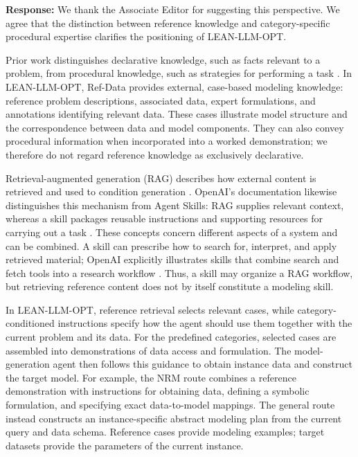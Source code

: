 {\color{blue}
\noindent\textbf{Response:}
We thank the Associate Editor for suggesting this perspective. We agree that the distinction between reference knowledge and category-specific procedural expertise clarifies the positioning of LEAN-LLM-OPT.

Prior work distinguishes declarative knowledge, such as facts relevant to a problem, from procedural knowledge, such as strategies for performing a task \citep{ae1_li2024metacognitive}. In LEAN-LLM-OPT, Ref-Data provides external, case-based modeling knowledge: reference problem descriptions, associated data, expert formulations, and annotations identifying relevant data. These cases illustrate model structure and the correspondence between data and model components. They can also convey procedural information when incorporated into a worked demonstration; we therefore do not regard reference knowledge as exclusively declarative.

Retrieval-augmented generation (RAG) describes how external content is retrieved and used to condition generation \citep{ae1_lewis2020rag}. OpenAI's documentation likewise distinguishes this mechanism from Agent Skills: RAG supplies relevant context, whereas a skill packages reusable instructions and supporting resources for carrying out a task \citep{ae1_openai2026accuracy,ae1_openai2026skills}. These concepts concern different aspects of a system and can be combined. A skill can prescribe how to search for, interpret, and apply retrieved material; OpenAI explicitly illustrates skills that combine search and fetch tools into a research workflow \citep{ae1_openai2026skilltools}. Thus, a skill may organize a RAG workflow, but retrieving reference content does not by itself constitute a modeling skill.

In LEAN-LLM-OPT, reference retrieval selects relevant cases, while category-conditioned instructions specify how the agent should use them together with the current problem and its data. For the predefined categories, selected cases are assembled into demonstrations of data access and formulation. The model-generation agent then follows this guidance to obtain instance data and construct the target model. For example, the NRM route combines a reference demonstration with instructions for obtaining data, defining a symbolic formulation, and specifying exact data-to-model mappings. The general route instead constructs an instance-specific abstract modeling plan from the current query and data schema. Reference cases provide modeling examples; target datasets provide the parameters of the current instance.

}
